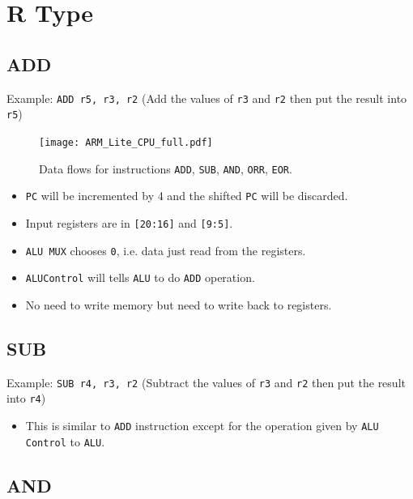 \documentclass[11pt,fancy,bibstyle=ieee]{elegantbook}
\begin{document}
  \section{R Type}

    \subsection{ADD}

      Example: \texttt{ADD r5, r3, r2} (Add the values of \texttt{r3} and \texttt{r2} then put the result into \texttt{r5})

      \begin{figure}[htbp]
        \centering
        \texttt{[image: ARM\_Lite\_CPU\_full.pdf]}
        \caption{Data flows for instructions \texttt{ADD}, \texttt{SUB}, \texttt{AND}, \texttt{ORR}, \texttt{EOR}.}
        \label{fig:CPU_p4}
      \end{figure}

      \begin{itemize}
        \item \texttt{PC} will be incremented by 4 and the shifted \texttt{PC} will be discarded.
        \item Input registers are in \texttt{[20:16]} and \texttt{[9:5]}.
        \item \texttt{ALU MUX} chooses \texttt{0}, i.e. data just read from the registers.
        \item \texttt{ALUControl} will tells \texttt{ALU} to do \texttt{ADD} operation.
        \item No need to write memory but need to write back to registers.
      \end{itemize}

    \subsection{SUB}
      Example: \texttt{SUB r4, r3, r2} (Subtract the values of \texttt{r3} and \texttt{r2} then put the result into \texttt{r4})

      \begin{itemize}
        \item This is similar to \texttt{ADD} instruction except for the operation given by \texttt{ALU Control} to \texttt{ALU}.
      \end{itemize}

    \subsection{AND}
\end{document}
